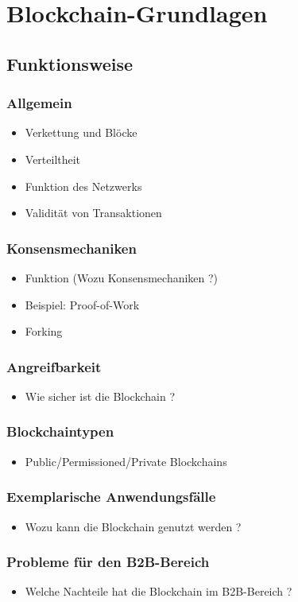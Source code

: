 \chapter{Blockchain-Grundlagen}
\label{cha:grundlagen}

\section{Funktionsweise}
\subsection{Allgemein}
\begin{itemize}
  \item Verkettung und Blöcke
  \item Verteiltheit
  \item Funktion des Netzwerks
  \item Validität von Transaktionen
\end{itemize}

\subsection{Konsensmechaniken}
\begin{itemize}
  \item Funktion (Wozu Konsensmechaniken ?)
  \item Beispiel: Proof-of-Work
  \item Forking
\end{itemize}

\subsection{Angreifbarkeit}
\begin{itemize}
  \item Wie sicher ist die Blockchain ?
\end{itemize}

\subsection{Blockchaintypen}
\begin{itemize}
  \item Public/Permissioned/Private Blockchains
\end{itemize}

\subsection{Exemplarische Anwendungsfälle}
\begin{itemize}
    \item Wozu kann die Blockchain genutzt werden ?
\end{itemize}

\subsection{Probleme für den B2B-Bereich}
\begin{itemize}
    \item Welche Nachteile hat die Blockchain im B2B-Bereich ?
\end{itemize}
